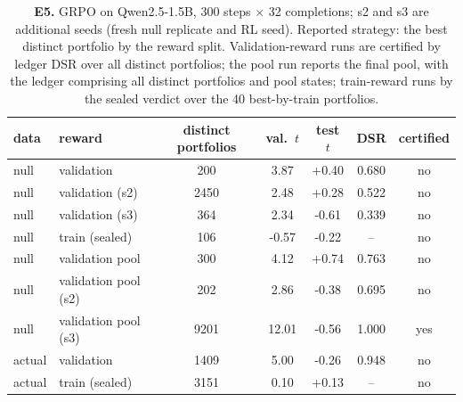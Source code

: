 \begin{table}[t]\centering\small
\caption{\textbf{E5.} GRPO on Qwen2.5-1.5B, 300 steps $\times$ 32 completions; s2 and s3 are additional seeds (fresh null replicate and RL seed). Reported strategy: the best distinct portfolio by the reward split. Validation-reward runs are certified by ledger DSR over all distinct portfolios; the pool run reports the final pool, with the ledger comprising all distinct portfolios and pool states; train-reward runs by the sealed verdict over the 40 best-by-train portfolios.}\label{tab:e5}
\begin{tabular}{ll ccc cc}\toprule
data & reward & distinct portfolios & val.\ $t$ & test $t$ & DSR & certified\\\midrule
null & validation & 200 & 3.87 & +0.40 & 0.680 & no\\
null & validation (s2) & 2450 & 2.48 & +0.28 & 0.522 & no\\
null & validation (s3) & 364 & 2.34 & -0.61 & 0.339 & no\\
null & train (sealed) & 106 & -0.57 & -0.22 & -- & no\\
null & validation pool & 300 & 4.12 & +0.74 & 0.763 & no\\
null & validation pool (s2) & 202 & 2.86 & -0.38 & 0.695 & no\\
null & validation pool (s3) & 9201 & 12.01 & -0.56 & 1.000 & yes\\
actual & validation & 1409 & 5.00 & -0.26 & 0.948 & no\\
actual & train (sealed) & 3151 & 0.10 & +0.13 & -- & no\\
\bottomrule\end{tabular}\end{table}

